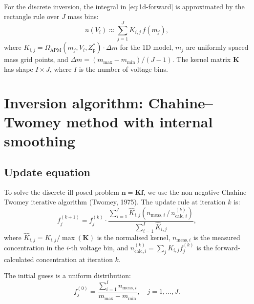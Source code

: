 \documentclass[11pt,a4paper]{article}
\begin{document}
For the discrete inversion, the integral in \eqref{eq:1d-forward} is
approximated by the rectangle rule over $J$ mass bins:
\begin{equation}
  n(V_{i}) \approx \sum_{j=1}^{J} K_{i,j} \, f(m_{j}),
  \label{eq:discrete-forward}
\end{equation}
where
$K_{i,j} = \Omega_{\mathrm{APM}}(m_{j}, V_{i}, Z_{\mathrm{p}}^{*})
\cdot \Delta m$
for the 1D model, $m_{j}$ are uniformly spaced mass grid points, and
$\Delta m = (m_{\mathrm{max}} - m_{\mathrm{min}})/(J - 1)$.
The kernel matrix $\mathbf{K}$ has shape $I \times J$, where $I$ is the
number of voltage bins.

\section{Inversion algorithm: Chahine--Twomey method with internal smoothing}
\label{sec:inversion}

\subsection{Update equation}
\label{sec:update-equation}

To solve the discrete ill-posed problem
$\mathbf{n} = \mathbf{K} \mathbf{f}$, we use the non-negative
Chahine--Twomey iterative algorithm (Twomey, 1975).  The update rule at
iteration $k$ is:
\begin{equation}
  f_{j}^{(k+1)} = f_{j}^{(k)} \cdot
    \frac{\displaystyle\sum_{i=1}^{I}
      \hat{K}_{i,j}
      \left( n_{\mathrm{meas},i} \,/\, n_{\mathrm{calc},i}^{(k)} \right)}
    {\displaystyle\sum_{i=1}^{I} \hat{K}_{i,j}},
  \label{eq:chahine-update}
\end{equation}
where $\hat{K}_{i,j} = K_{i,j} / \max(\mathbf{K})$ is the normalised kernel,
$n_{\mathrm{meas},i}$ is the measured concentration in the $i$-th voltage bin,
and $n_{\mathrm{calc},i}^{(k)} = \sum_{j} K_{i,j} f_{j}^{(k)}$ is the
forward-calculated concentration at iteration $k$.

The initial guess is a uniform distribution:
\begin{equation}
  f_{j}^{(0)} =
    \frac{\sum_{i=1}^{I} n_{\mathrm{meas},i}}
         {m_{\mathrm{max}} - m_{\mathrm{min}}},
  \quad j = 1, \ldots, J.
  \label{eq:initial-guess}
\end{equation}
\end{document}
